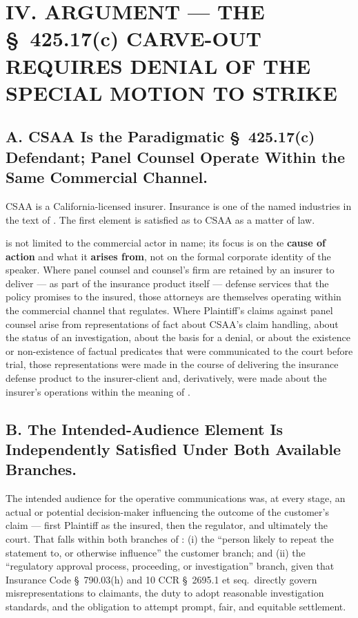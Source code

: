 \section*{IV. ARGUMENT --- THE \S~425.17(c) CARVE-OUT REQUIRES DENIAL OF THE SPECIAL MOTION TO STRIKE}

\subsection*{A. CSAA Is the Paradigmatic \S~425.17(c) Defendant; Panel Counsel Operate Within the Same Commercial Channel.}

CSAA is a California-licensed insurer. Insurance is one of the named industries in the text of . The first element is satisfied as to CSAA as a matter of law.

 is not limited to the commercial actor in name; its focus is on the \textbf{cause of action} and what it \textbf{arises from}, not on the formal corporate identity of the speaker. Where panel counsel and counsel's firm are retained by an insurer to deliver --- as part of the insurance product itself --- defense services that the policy promises to the insured, those attorneys are themselves operating within the commercial channel that  regulates. Where Plaintiff's claims against panel counsel arise from representations of fact about CSAA's claim handling, about the status of an investigation, about the basis for a denial, or about the existence or non-existence of factual predicates that were communicated to the court before trial, those representations were made in the course of delivering the insurance defense product to the insurer-client and, derivatively, were made about the insurer's operations within the meaning of .

\subsection*{B. The Intended-Audience Element Is Independently Satisfied Under Both Available Branches.}

The intended audience for the operative communications was, at every stage, an actual or potential decision-maker influencing the outcome of the customer's claim --- first Plaintiff as the insured, then the regulator, and ultimately the court. That falls within both branches of : (i) the ``person likely to repeat the statement to, or otherwise influence'' the customer branch; and (ii) the ``regulatory approval process, proceeding, or investigation'' branch, given that Insurance Code \S~790.03(h) and 10 CCR \S~2695.1 et seq.\ directly govern misrepresentations to claimants, the duty to adopt reasonable investigation standards, and the obligation to attempt prompt, fair, and equitable settlement.

